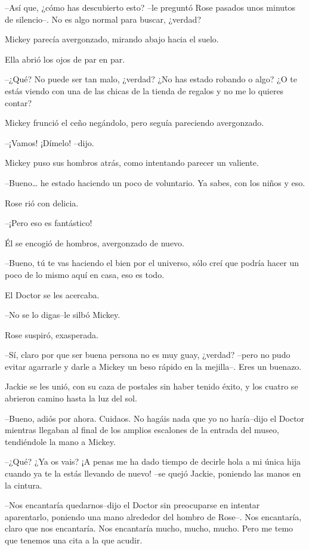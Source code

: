 --Así que, ¿cómo has descubierto esto? --le preguntó Rose pasados unos
minutos de silencio--. No es algo normal para buscar, ¿verdad?

Mickey parecía avergonzado, mirando abajo hacia el suelo.

Ella abrió los ojos de par en par.

--¿Qué? No puede ser tan malo, ¿verdad? ¿No has estado robando o algo?
¿O te estás viendo con una de las chicas de la tienda de regalos y no me
lo quieres contar?

Mickey frunció el ceño negándolo, pero seguía pareciendo avergonzado.

--¡Vamos! ¡Dímelo! --dijo.

Mickey puso sus hombros atrás, como intentando parecer un valiente.

--Bueno\ldots{} he estado haciendo un poco de voluntario. Ya sabes, con
los niños y eso.

Rose rió con delicia.

--¡Pero eso es fantástico!

Él se encogió de hombros, avergonzado de nuevo.

--Bueno, tú te vas haciendo el bien por el universo, sólo creí que
podría hacer un poco de lo mismo aquí en casa, eso es todo.

El Doctor se les acercaba.

--No se lo digas--le silbó Mickey.

Rose suspiró, exasperada.

--Sí, claro por que ser buena persona no es muy guay, ¿verdad? --pero no
pudo evitar agarrarle y darle a Mickey un beso rápido en la mejilla--.
Eres un buenazo.

Jackie se les unió, con su caza de postales sin haber tenido éxito, y
los cuatro se abrieron camino hasta la luz del sol.

--Bueno, adiós por ahora. Cuidaos. No hagáis nada que yo no haría--dijo
el Doctor mientras llegaban al final de los amplios escalones de la
entrada del museo, tendiéndole la mano a Mickey.

--¿Qué? ¿Ya os vais? ¡A penas me ha dado tiempo de decirle hola a mi
única hija cuando ya te la estás llevando de nuevo! --se quejó Jackie,
poniendo las manos en la cintura.

--Nos encantaría quedarnos--dijo el Doctor sin preocuparse en intentar
aparentarlo, poniendo una mano alrededor del hombro de Rose--. Nos
encantaría, claro que nos encantaría. Nos encantaría mucho, mucho,
mucho. Pero me temo que tenemos una cita a la que acudir.

